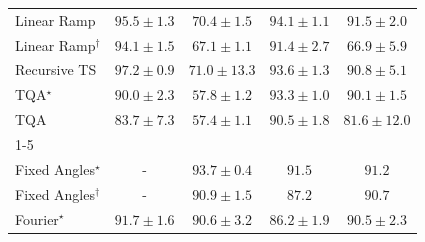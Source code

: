 \begin{tabular}{l|cccc|}
Linear Ramp & {\cellcolor[HTML]{802D05}} \color[HTML]{F1F1F1} $95.5\pm 1.3$ & {\cellcolor[HTML]{FEBE4A}} \color[HTML]{000000} $70.4\pm 1.5$ & {\cellcolor[HTML]{8B3005}} \color[HTML]{F1F1F1} $94.1\pm 1.1$ & {\cellcolor[HTML]{A33904}} \color[HTML]{F1F1F1} $91.5\pm 2.0$ \\
Linear Ramp$^\dagger$ & {\cellcolor[HTML]{8B3005}} \color[HTML]{F1F1F1} $94.1\pm 1.5$ & {\cellcolor[HTML]{FED26D}} \color[HTML]{000000} $67.1\pm 1.1$ & {\cellcolor[HTML]{A33904}} \color[HTML]{F1F1F1} $91.4\pm 2.7$ & {\cellcolor[HTML]{FED36F}} \color[HTML]{000000} $66.9\pm 5.9$ \\
Recursive TS & {\cellcolor[HTML]{702806}} \color[HTML]{F1F1F1} $97.2\pm 0.9$ & {\cellcolor[HTML]{FEBA46}} \color[HTML]{000000} $71.0\pm 13.3$ & {\cellcolor[HTML]{903104}} \color[HTML]{F1F1F1} $93.6\pm 1.3$ & {\cellcolor[HTML]{A93C03}} \color[HTML]{F1F1F1} $90.8\pm 5.1$ \\
TQA$^\star$ & {\cellcolor[HTML]{B03F03}} \color[HTML]{F1F1F1} $90.0\pm 2.3$ & {\cellcolor[HTML]{FFF7BE}} \color[HTML]{000000} $57.8\pm 1.2$ & {\cellcolor[HTML]{933204}} \color[HTML]{F1F1F1} $93.3\pm 1.0$ & {\cellcolor[HTML]{B03F03}} \color[HTML]{F1F1F1} $90.1\pm 1.5$ \\
TQA & {\cellcolor[HTML]{DD5F0C}} \color[HTML]{F1F1F1} $83.7\pm 7.3$ & {\cellcolor[HTML]{FFF8C2}} \color[HTML]{000000} $57.4\pm 1.1$ & {\cellcolor[HTML]{AB3C03}} \color[HTML]{F1F1F1} $90.5\pm 1.8$ & {\cellcolor[HTML]{E96D13}} \color[HTML]{F1F1F1} $81.6\pm 12.0$ \\
\cline{1-5}
\multicolumn{5}{c}{\rule{0pt}{8pt}PP} \\
\midrule
Fixed Angles$^\star$ & {\cellcolor[HTML]{000000}} \color[HTML]{F1F1F1} {\cellcolor{white}} \color{black} - & {\cellcolor[HTML]{006234}} \color[HTML]{F1F1F1} $93.7\pm 0.4$ & {\cellcolor[HTML]{076D39}} \color[HTML]{F1F1F1} $91.5$ & {\cellcolor[HTML]{096F3A}} \color[HTML]{F1F1F1} $91.2$ \\
Fixed Angles$^\dagger$ & {\cellcolor[HTML]{000000}} \color[HTML]{F1F1F1} {\cellcolor{white}} \color{black} - & {\cellcolor[HTML]{0A703A}} \color[HTML]{F1F1F1} $90.9\pm 1.5$ & {\cellcolor[HTML]{218242}} \color[HTML]{F1F1F1} $87.2$ & {\cellcolor[HTML]{0B713B}} \color[HTML]{F1F1F1} $90.7$ \\
Fourier$^\star$ & {\cellcolor[HTML]{066D39}} \color[HTML]{F1F1F1} $91.7\pm 1.6$ & {\cellcolor[HTML]{0C723B}} \color[HTML]{F1F1F1} $90.6\pm 3.2$ & {\cellcolor[HTML]{268846}} \color[HTML]{F1F1F1} $86.2\pm 1.9$ & {\cellcolor[HTML]{0C723B}} \color[HTML]{F1F1F1} $90.5\pm 2.3$ \\

\end{tabular}
